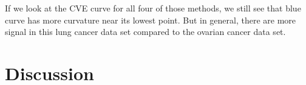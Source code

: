 \documentclass{article}\usepackage[]{graphicx}\usepackage[]{color}
\begin{document}
If we look at the CVE curve for all four of those methods, we still see that blue curve has more curvature near its lowest point. But in general, there are more signal in this lung cancer data set compared to the ovarian cancer data set.

\section{Discussion}






\end{document}

